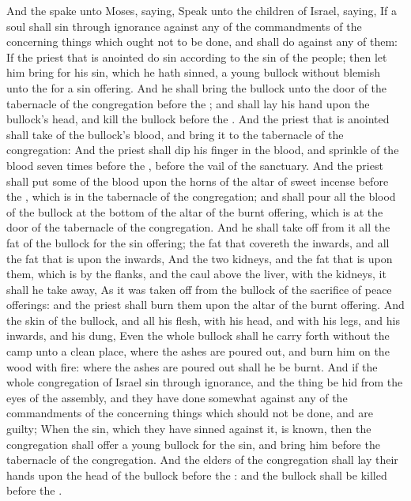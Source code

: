 \begin{biblechapter} %
 And the \LORD spake unto Moses, saying,
\verse Speak unto the children of Israel, saying, If a soul shall sin through ignorance against any of the commandments of the \LORD concerning things which ought not to be done, and shall do against any of them:
\verse If the priest that is anointed do sin according to the sin of the people; then let him bring for his sin, which he hath sinned, a young bullock without blemish unto the \LORD for a sin offering.
\verse And he shall bring the bullock unto the door of the tabernacle of the congregation before the \LORD; and shall lay his hand upon the bullock's head, and kill the bullock before the \LORD.
\verse And the priest that is anointed shall take of the bullock's blood, and bring it to the tabernacle of the congregation:
\verse And the priest shall dip his finger in the blood, and sprinkle of the blood seven times before the \LORD, before the vail of the sanctuary.
\verse And the priest shall put some of the blood upon the horns of the altar of sweet incense before the \LORD, which is in the tabernacle of the congregation; and shall pour all the blood of the bullock at the bottom of the altar of the burnt offering, which is at the door of the tabernacle of the congregation.
\verse And he shall take off from it all the fat of the bullock for the sin offering; the fat that covereth the inwards, and all the fat that is upon the inwards,
\verse And the two kidneys, and the fat that is upon them, which is by the flanks, and the caul above the liver, with the kidneys, it shall he take away,
\verse As it was taken off from the bullock of the sacrifice of peace offerings: and the priest shall burn them upon the altar of the burnt offering.
\verse And the skin of the bullock, and all his flesh, with his head, and with his legs, and his inwards, and his dung,
\verse Even the whole bullock shall he carry forth without the camp unto a clean place, where the ashes are poured out, and burn him on the wood with fire: where the ashes are poured out shall he be burnt.
\verse And if the whole congregation of Israel sin through ignorance, and the thing be hid from the eyes of the assembly, and they have done somewhat against any of the commandments of the \LORD concerning things which should not be done, and are guilty;
\verse When the sin, which they have sinned against it, is known, then the congregation shall offer a young bullock for the sin, and bring him before the tabernacle of the congregation.
\verse And the elders of the congregation shall lay their hands upon the head of the bullock before the \LORD: and the bullock shall be killed before the \LORD.

\end{biblechapter}
